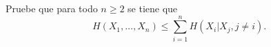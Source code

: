 Pruebe que para todo $n \geq 2$ se tiene que 
\[
H(X_1, \dots, X_n) \leq \sum_{i=1}^{n} H(X_i | X_j, j \neq i).
\]
